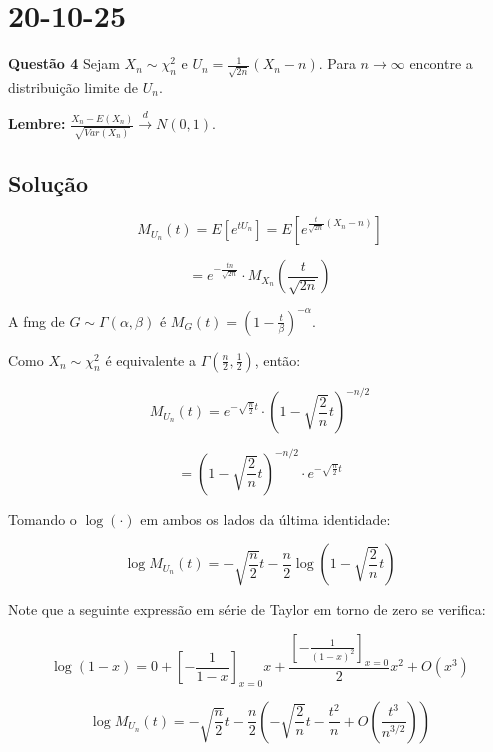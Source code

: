 \section*{20-10-25}

\textbf{Questão 4} Sejam $X_n \sim \chi^2_n$ e $U_n = \frac{1}{\sqrt{2n}}(X_n - n)$. Para $n \to \infty$ encontre a distribuição limite de $U_n$. 

\textbf{Lembre:} $\frac{X_n - E(X_n)}{\sqrt{Var(X_n)}} \xrightarrow{d} N(0,1)$.

\subsection*{Solução}

\begin{equation}
M_{U_n}(t) = E\left[ e^{t U_n} \right] = E\left[ e^{\frac{t}{\sqrt{2n}}(X_n - n)} \right]
\end{equation}

\begin{equation}
= e^{-\frac{t n}{\sqrt{2n}}} \cdot M_{X_n}\left( \frac{t}{\sqrt{2n}} \right)
\end{equation}

A fmg de $G \sim \Gamma(\alpha, \beta)$ é $M_G(t) = (1 - \frac{t}{\beta })^{-\alpha}$.

Como $X_n \sim \chi^2_n$ é equivalente a $\Gamma\left( \frac{n}{2}, \frac{1}{2} \right)$, então:

\begin{equation}
M_{U_n}(t) = e^{-\sqrt{\frac{n}{2}} t} \cdot \left( 1 - \sqrt{\frac{2}{n}} t \right)^{-n/2}
\end{equation}

\begin{equation}
= \left( 1 - \sqrt{\frac{2}{n}} t \right)^{-n/2} \cdot e^{-\sqrt{\frac{n}{2}} t}
\end{equation}

Tomando o $\log(\cdot)$ em ambos os lados da última identidade:

\begin{equation}
\log M_{U_n}(t) = -\sqrt{\frac{n}{2}} t - \frac{n}{2} \log\left( 1 - \sqrt{\frac{2}{n}} t \right)
\end{equation}

Note que a seguinte expressão em série de Taylor em torno de zero se verifica:

\begin{equation}
\log(1 - x) = 0 + \left[ -\frac{1}{1 - x} \right]_{x=0} x + \frac{\left[ -\frac{1}{(1 - x)^2} \right]_{x=0}}{2} x^2 + O(x^3)
\end{equation}

\begin{equation}
\log M_{U_n}(t) = -\sqrt{\frac{n}{2}} t - \frac{n}{2} \left( -\sqrt{\frac{2}{n}} t - \frac{t^2}{n} + O\left( \frac{t^3}{n^{3/2}} \right) \right)
\end{equation}